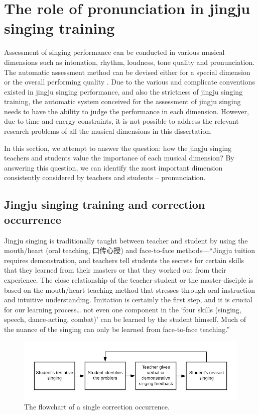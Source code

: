 \section{The role of pronunciation in jingju singing training}\label{sec:probdef:role_pronunciation}

Assessment of singing performance can be conducted in various musical dimensions such as intonation, rhythm, loudness, tone quality and pronunciation. The automatic assessment method can be devised either for a special dimension or the overall performing quality \cite{Guptab}. Due to the various and complicate conventions existed in jingju singing performance, and also the strictness of jingju singing training, the automatic system conceived for the assessment of jingju singing needs to have the ability to judge the performance in each dimension. However, due to time and energy constraints, it is not possible to address the relevant research problems of all the musical dimensions in this dissertation. 

In this section, we attempt to answer the question: how the jingju singing teachers and students value the importance of each musical dimension? By answering this question, we can identify the most important dimension consistently considered by teachers and students -- pronunciation.

\subsection{Jingju singing training and correction occurrence}\label{sec:probdef:correction_occurance}

Jingju singing is traditionally taught between teacher and student by using the mouth/heart (oral teaching, 口传心授) and face-to-face methods—“Jingju tuition requires demonstration, and teachers tell students the secrets for certain skills that they learned from their masters or that they worked out from their experience. The close relationship of the teacher-student or the master-disciple is based on the mouth/heart teaching method that stresses through oral instruction and intuitive understanding. Imitation is certainly the first step, and it is crucial for our learning process… not even one component in the `four skills (singing, speech, dance-acting, combat)' can be learned by the student himself. Much of the nuance of the singing can only be learned from face-to-face teaching.” \cite{Li2010a}

\begin{figure}[ht!]
\includegraphics[width=\textwidth]{figs/blockDiags_rong/ch3_occurrance_flow.png}
\caption{The flowchart of a single correction occurrence.}
\label{fig:ch3_occurrance_flow}
\end{figure}

